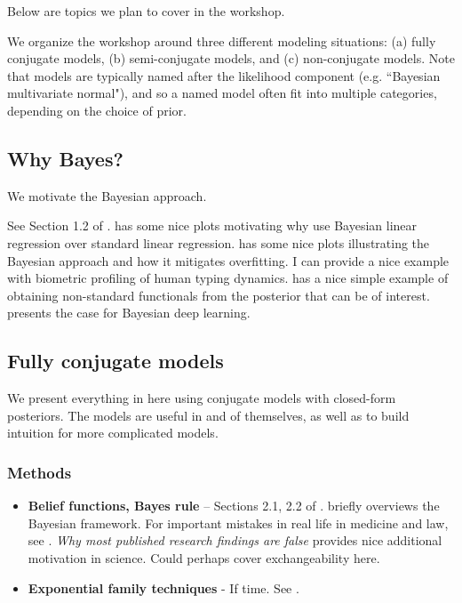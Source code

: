 \documentclass{article} %
\begin{document}
Below are topics we plan to cover in the workshop.

We organize the workshop around three different modeling situations: (a) fully conjugate models, (b) semi-conjugate models, and (c) non-conjugate models. Note that models are typically named after the likelihood component (e.g. ``Bayesian multivariate normal"), and so a named model often fit into multiple categories, depending on the choice of prior.

\subsection{Why Bayes?}

We motivate the Bayesian approach.

See Section 1.2 of \cite{hoff2009first}.   \cite{bishop2006pattern} has some nice plots motivating why use Bayesian linear regression over standard linear regression.   \cite{ghahramani2013bayesian}  has some nice plots illustrating the Bayesian approach and how it mitigates overfitting.   I can provide a nice example with biometric profiling of human typing dynamics.   \cite{held2006bayesian} has a nice simple example of obtaining non-standard functionals from the posterior that can be of interest.   \cite{wilson2020case} presents the case for Bayesian deep learning.  

\subsection{Fully conjugate models}

We present everything in here using conjugate models with closed-form posteriors.  The models are useful in and of themselves,  as well as to build intuition for more complicated models.   

\subsubsection{Methods}
	\begin{itemize}
	\item \textbf{Belief functions,  Bayes rule} -- Sections 2.1,  2.2 of \cite{hoff2009first}.   \cite{ghahramani2013bayesian} briefly overviews the Bayesian framework.   For important mistakes in real life in medicine and law,  see \cite{guardianXXXXobscure}.  \textit{Why most published research findings are false} \cite{ioannidis2005most} provides nice additional motivation in science.    Could perhaps cover exchangeability here. 
	\item \textbf{Exponential family techniques} - If time.  See \cite{wojnowiczXXXXexponential}.
	\end{itemize}
\end{document}
